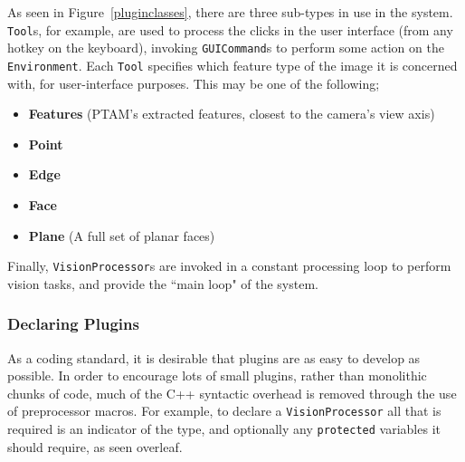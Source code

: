 \documentclass[a4paper,10pt]{report}
\begin{document}
As seen in Figure~\ref{pluginclasses}, there are three sub-types in use in the system. \texttt{Tool}s, for example, are used to process the clicks in the user interface (from any hotkey on the keyboard), invoking \texttt{GUICommand}s to perform some action on the \texttt{Environment}. Each \texttt{Tool} specifies which feature type of the image it is concerned with, for user-interface purposes. This may be one of the following;
\begin{itemize}
\item{\textbf{Features} (PTAM's extracted features, closest to the camera's view axis)}
\item{\textbf{Point}}
\item{\textbf{Edge}}
\item\textbf{{Face}}
\item{\textbf{Plane} (A full set of planar faces)}
\end{itemize}

Finally, \texttt{VisionProcessor}s are invoked in a constant processing loop to perform vision tasks, and provide the ``main loop" of the system.

\subsubsection{Declaring Plugins}
As a coding standard, it is desirable that plugins are as easy to develop as possible. In order to encourage lots of small plugins, rather than monolithic chunks of code, much of the C++ syntactic overhead is removed through the use of preprocessor macros. For example, to declare a \texttt{VisionProcessor} all that is required is an indicator of the type, and optionally any \texttt{protected} variables it should require, as seen overleaf.

\vspace{10pt}
\noindent
\ttfamily
\hlstd{}\hlstd{}\hlopt{(\ }\hlopt{,\ }\hlopt{;\ );}\\
\hlstd{}\hlopt{::}\hlstd{}\hlstd{}\hlopt{(\ }\hlopt{::}\hlopt{\usebox{\hlboxlessthan}}\hlopt{::}\hlopt{\usebox{\hlboxgreaterthan}\&\ }\hlopt{,\ }
\hlstd{\ \ \ \ }\hlstd{\ \ \ \ }\hlstd{\ \ \ \ }\hlopt{::}\hlopt{\usebox{\hlboxlessthan}\ }\hlopt{::}\hlopt{\usebox{\hlboxlessthan}}\hlopt{::}\hlopt{\usebox{\hlboxgreaterthan}\ \usebox{\hlboxgreaterthan}\&\ }\hlopt{)\ \usebox{\hlboxopenbrace}}\\
\hlstd{}\hlstd{\ \ \ \ }\hlstd{}\\
\hlstd{}\hlopt{\usebox{\hlboxclosebrace}}\hlstd{}\\
\mbox{}
\normalfont
\normalsize
\end{document}

